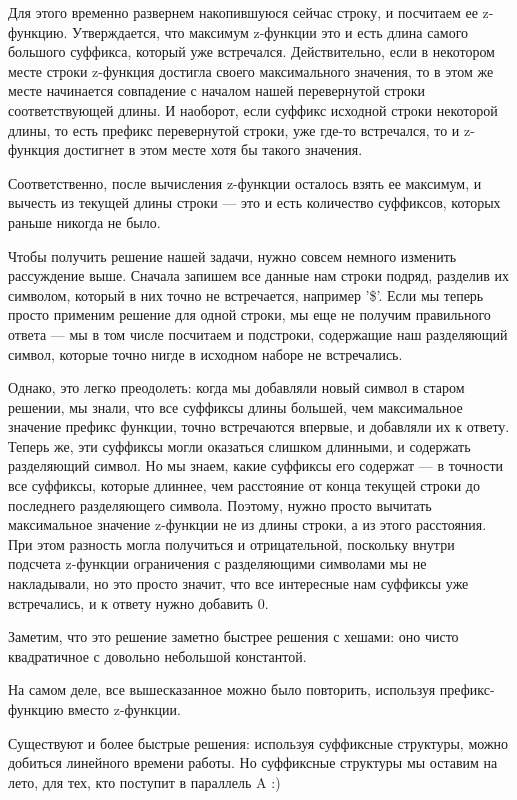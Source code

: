 \documentclass[12pt]{article}
\theoremstyle{definition}
\begin{document}
Для этого временно развернем накопившуюся сейчас строку, и посчитаем ее z-функцию.
Утверждается, что максимум z-функции это и есть длина самого большого суффикса, который
уже встречался. Действительно, если в некотором месте строки z-функция достигла своего
максимального значения, то в этом же месте начинается совпадение с началом нашей
перевернутой строки соответствующей длины. И наоборот, если суффикс исходной строки
некоторой длины, то есть префикс перевернутой строки, уже где-то встречался,
то и z-функция достигнет в этом месте хотя бы такого значения.

Соответственно, после вычисления z-функции осталось взять ее максимум, и вычесть из текущей длины строки --- это и есть количество суффиксов, которых раньше никогда не было.

Чтобы получить решение нашей задачи, нужно совсем немного изменить рассуждение выше.
Сначала запишем все данные нам строки подряд, разделив их символом, который в них точно
не встречается, например '\$'. Если мы теперь просто применим решение для одной строки,
мы еще не получим правильного ответа --- мы в том числе посчитаем и подстроки,
содержащие наш разделяющий символ, которые точно нигде в исходном наборе не встречались.

Однако, это легко преодолеть: когда мы добавляли новый символ в старом решении, мы
знали, что все суффиксы длины большей, чем максимальное значение префикс функции,
точно встречаются впервые, и добавляли их к ответу. Теперь же, эти суффиксы могли
оказаться слишком длинными, и содержать разделяющий символ. Но мы знаем, какие суффиксы его содержат --- в точности все суффиксы, которые длиннее, чем расстояние от
конца текущей строки до последнего разделяющего символа. Поэтому, нужно просто
вычитать максимальное значение z-функции не из длины строки, а из этого расстояния.
При этом разность могла получиться и отрицательной, поскольку внутри подсчета z-функции
ограничения с разделяющими символами мы не накладывали, но это просто
значит, что все интересные нам суффиксы уже встречались, и к ответу нужно добавить 0.

Заметим, что это решение заметно быстрее решения с хешами: оно чисто квадратичное
с довольно небольшой константой.

На самом деле, все вышесказанное можно было повторить,
используя префикс-функцию вместо z-функции.

Существуют и более быстрые решения: используя суффиксные структуры, можно добиться
линейного времени работы. Но суффиксные структуры мы оставим на лето,
для тех, кто поступит в параллель A :)
\end{document}
